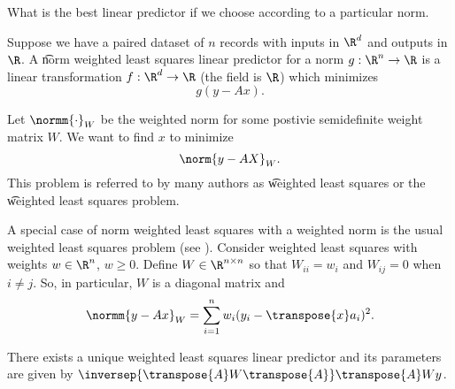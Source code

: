 

What is the best linear predictor if we choose according to a particular norm.


Suppose we have a paired dataset of $n$ records with inputs in $\R^d$ and outputs in $\R$.
A \t{norm weighted least squares linear predictor} for a norm $g: \R^n \to \R$ is a linear transformation $f: \R^d \to \R$ (the field is $\R$) which minimizes
\[
  g(y - Ax).
\]


Let $\normm{\cdot}_{W}$ be the weighted norm for some postivie semidefinite weight matrix $W$.
We want to find $x$ to minimize
\[
  \norm{y - AX}_{W}.
\]
This problem is referred to by many authors as \t{weighted least squares} or the \t{weighted least squares problem}.



A special case of norm weighted least squares with a weighted norm is the usual weighted least squares problem (see ).
Consider weighted least squares with weights $w \in \R^n$, $w \geq 0$.
Define $W \in \R^{n \times n}$ so that $W_{ii} = w_i$ and $W_{ij} = 0$ when $i \neq j$.
So, in particular, $W$ is a diagonal matrix and
\[
  \normm{y - Ax}_{W} = \sum_{i = 1}^{n} w_i(y_i  - \transpose{x}a_i)^2.
\]

\begin{proposition}
There exists a unique weighted least squares linear predictor and its parameters are given by $\inversep{\transpose{A}W\transpose{A}}\transpose{A}Wy$.
\end{proposition}
